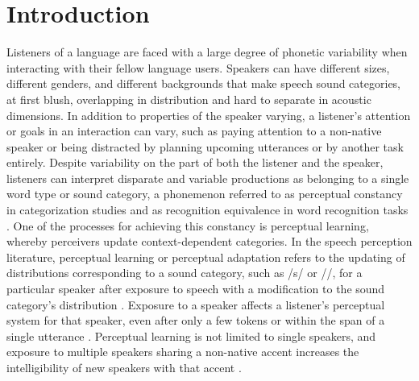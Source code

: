 
\chapter{Introduction}

Listeners of a language are faced with a large degree of phonetic variability when interacting with their fellow language users.  
Speakers can have different sizes, different genders, and different backgrounds that make speech sound categories, at first blush, overlapping in distribution and hard to separate in acoustic dimensions.
In addition to properties of the speaker varying, a listener's attention or goals in an interaction can vary, such as paying attention to a non-native speaker or being distracted by planning upcoming utterances or by another task entirely.  
Despite variability on the part of both the listener and the speaker, listeners can interpret disparate and variable productions as belonging to a single word type or sound category, a phonemenon referred to as perceptual constancy in categorization studies \citep{Shankweiler1977, Kuhl1979} and as recognition equivalence in word recognition tasks \citep{Sumner2013}.
One of the processes for achieving this constancy is perceptual learning, whereby perceivers update context-dependent categories.
In the speech perception literature, perceptual learning or perceptual adaptation refers to the updating of distributions corresponding to a sound category, such as /s/ or /\textesh/, for a particular speaker after exposure to speech with a modification to the sound category's distribution \citep{Norris2003}.
Exposure to a speaker affects a listener's perceptual system for that speaker,  even after only a few tokens \citep{Vroomen2004, Kraljic2008} or within the span of a single utterance \citep{Ladefoged1957}.
Perceptual learning is not limited to single speakers, and exposure to multiple speakers sharing a non-native accent increases the intelligibility of new speakers with that accent \citep{Bradlow2008}.

%


